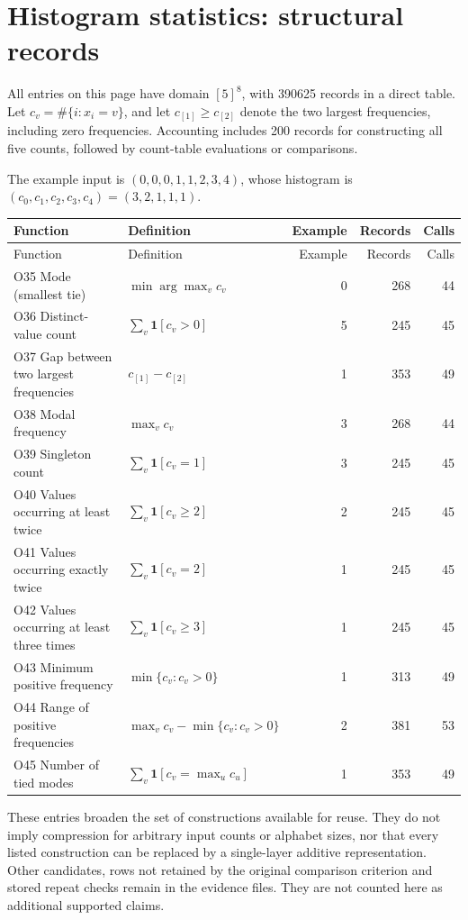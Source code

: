 \documentclass[a4paper,10pt]{article}
\newcommand{\ind}{\mathbf{1}}
\begin{document}
\newpage
\section{Histogram statistics: structural records}
All entries on this page have domain $[5]^8$, with 390625 records in a direct table. Let $c_v=\#\{i:x_i=v\}$, and let $c_{[1]}\ge c_{[2]}$ denote the two largest frequencies, including zero frequencies. Accounting includes 200 records for constructing all five counts, followed by count-table evaluations or comparisons.

The example input is $(0,0,0,1,1,2,3,4)$, whose histogram is $(c_0,c_1,c_2,c_3,c_4)=(3,2,1,1,1)$.

\begin{longtable}{@{}p{58mm}p{60mm}rrr@{}}
\toprule
Function & Definition & Example & Records & Calls\\\midrule
\endfirsthead
\toprule
Function & Definition & Example & Records & Calls\\\midrule
\endhead
O35 Mode (smallest tie) & $\min\arg\max_v c_v$ & 0 & 268 & 44\\
O36 Distinct-value count & $\sum_v\ind[c_v>0]$ & 5 & 245 & 45\\
O37 Gap between two largest frequencies & $c_{[1]}-c_{[2]}$ & 1 & 353 & 49\\
O38 Modal frequency & $\max_vc_v$ & 3 & 268 & 44\\
O39 Singleton count & $\sum_v\ind[c_v=1]$ & 3 & 245 & 45\\
O40 Values occurring at least twice & $\sum_v\ind[c_v\ge2]$ & 2 & 245 & 45\\
O41 Values occurring exactly twice & $\sum_v\ind[c_v=2]$ & 1 & 245 & 45\\
O42 Values occurring at least three times & $\sum_v\ind[c_v\ge3]$ & 1 & 245 & 45\\
O43 Minimum positive frequency & $\min\{c_v:c_v>0\}$ & 1 & 313 & 49\\
O44 Range of positive frequencies & $\max_vc_v-\min\{c_v:c_v>0\}$ & 2 & 381 & 53\\
O45 Number of tied modes & $\sum_v\ind[c_v=\max_uc_u]$ & 1 & 353 & 49\\
\bottomrule\end{longtable}

These entries broaden the set of constructions available for reuse. They do not imply compression for arbitrary input counts or alphabet sizes, nor that every listed construction can be replaced by a single-layer additive representation. Other candidates, rows not retained by the original comparison criterion and stored repeat checks remain in the evidence files. They are not counted here as additional supported claims.
\end{document}
